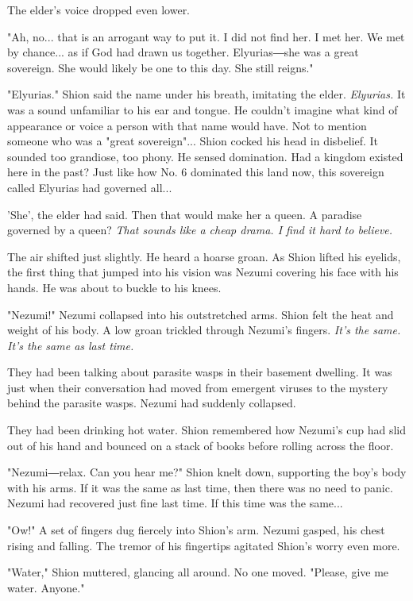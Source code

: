 The elder's voice dropped even lower.

"Ah, no... that is an arrogant way to put it. I did not find her. I met
her. We met by chance... as if God had drawn us together. Elyurias―she
was a great sovereign. She would likely be one to this day. She still
reigns."

"Elyurias." Shion said the name under his breath, imitating the elder.
\emph{Elyurias.} It was a sound unfamiliar to his ear and tongue. He couldn't
imagine what kind of appearance or voice a person with that name would
have. Not to mention someone who was a "great sovereign"... Shion cocked
his head in disbelief. It sounded too grandiose, too phony. He sensed
domination. Had a kingdom existed here in the past? Just like how No. 6
dominated this land now, this sovereign called Elyurias had governed
all...

'She', the elder had said. Then that would make her a queen. A paradise
governed by a queen? \emph{That sounds like a cheap drama. I find it hard to
	believe.}

The air shifted just slightly. He heard a hoarse groan. As Shion lifted
his eyelids, the first thing that jumped into his vision was Nezumi
covering his face with his hands. He was about to buckle to his knees.

\mybreak

"Nezumi!" Nezumi collapsed into his outstretched arms. Shion felt the
heat and weight of his body. A low groan trickled through Nezumi's
fingers. \emph{It's the same. It's the same as last time.}

They had been talking about parasite wasps in their basement dwelling.
It was just when their conversation had moved from emergent viruses to
the mystery behind the parasite wasps. Nezumi had suddenly collapsed.

They had been drinking hot water. Shion remembered how Nezumi's cup had
slid out of his hand and bounced on a stack of books before rolling
across the floor.

"Nezumi―relax. Can you hear me?" Shion knelt down, supporting the boy's
body with his arms. If it was the same as last time, then there was no
need to panic. Nezumi had recovered just fine last time. If this time
was the same...~

"Ow!" A set of fingers dug fiercely into Shion's arm. Nezumi gasped, his
chest rising and falling. The tremor of his fingertips agitated Shion's
worry even more.

"Water," Shion muttered, glancing all around. No one moved. "Please,
give me water. Anyone."

